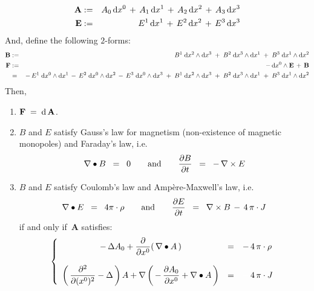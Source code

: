 \begin{theorem}
\begin{eqnarray*}
\mathbf{A}
& := &
	A_{0}\,\textnormal{d} x^{0} \,+\, A_{1}\,\textnormal{d} x^{1}  \,+\, A_{2}\,\textnormal{d} x^{2}  \,+\, A_{3}\,\textnormal{d} x^{3}
\\
\mathbf{E}
& := &
	E^{1}\,\textnormal{d} x^{1} \,+\, E^{2}\,\textnormal{d} x^{2} \,+\, E^{3}\,\textnormal{d} x^{3}
\end{eqnarray*}
\vskip 0.3cm
\noindent
And, define the following $2$-forms:
\begin{eqnarray*}
\mathbf{B}
& := &
	B^{1}\;\textnormal{d} x^{2} \wedge \textnormal{d} x^{3}
	\;+\;
	B^{2}\;\textnormal{d} x^{3} \wedge \textnormal{d} x^{1}
	\;+\;
	B^{3}\;\textnormal{d} x^{1} \wedge \textnormal{d} x^{2}
\\
\mathbf{F}
& := &
	- \, \textnormal{d} x^{0} \wedge \mathbf{E} \, + \, \mathbf{B}
\\
& = &
	- \, E^{1}\;\textnormal{d} x^{0} \wedge \textnormal{d} x^{1} \, - \, E^{2}\;\textnormal{d} x^{0} \wedge \textnormal{d} x^{2} \, - \, E^{3}\;\textnormal{d} x^{0} \wedge \textnormal{d} x^{3}
	\;+\;
	B^{1}\;\textnormal{d} x^{2} \wedge \textnormal{d} x^{3}
	\;+\;
	B^{2}\;\textnormal{d} x^{3} \wedge \textnormal{d} x^{1}
	\;+\;
	B^{3}\;\textnormal{d} x^{1} \wedge \textnormal{d} x^{2}
\end{eqnarray*}
Then,
\begin{enumerate}
\item
	$\mathbf{F} \; = \; \textnormal{d}\,\mathbf{A}$.
\item
	$B$ and $E$ satisfy Gauss's law for magnetism (non-existence of magnetic monopoles) and Faraday's law, i.e.
	\begin{equation*}
	\nabla \bullet B \;\; = \;\; 0
	\quad\quad\textnormal{and}\quad\quad
	\dfrac{\partial B}{\partial t} \;\; = \;\; -\,\nabla \times E
	\end{equation*}	
\item	
	$B$ and $E$ satisfy Coulomb's law and Amp\`{e}re-Maxwell's law, i.e.
	\begin{equation*}
	\nabla \bullet E \;\; = \;\; 4 \pi \cdot \rho
	\quad\quad\textnormal{and}\quad\quad
	\dfrac{\partial E}{\partial t} \;\; = \;\; \nabla \times B \,-\, 4\,\pi\cdot J
	\end{equation*}
	if and only if \,$\mathbf{A}$ satisfies:
	\begin{equation*}
	\left\{\begin{array}{ccl}
		-\,\Delta A_{0} + \dfrac{\partial}{\partial x^{0}}\!\left(\,\nabla \bullet A\,\right)
		& = &
			- \, 4\,\pi\cdot\rho
		\\ \\
		\left(\,\dfrac{\partial^{2}}{\partial(x^{0})^{2}} - \Delta\,\right)A
		+
		\nabla\left(\, -\,\dfrac{\partial A_{0}}{\partial x^{0}} + \nabla \bullet A \,\right)
		& = &
			{\color{white}-} \, 4\,\pi \cdot J
		\end{array}\right.
	\end{equation*}
\end{enumerate}
\end{theorem}

